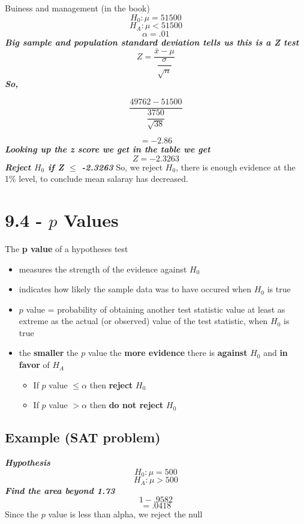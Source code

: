 \documentclass{report}
\begin{document}
\pagebreak
\noindent 
\q
Buiness and management (in the book)
\bigbreak \noindent 
$$ H_0 : \mu = 51500$$
$$ H_A : \mu < 51500$$
$$ \alpha = .01$$
\textit{\textbf{Big sample and population standard deviation tells us this is a Z test}}
$$ Z = \dfrac{\bar{x} - \mu}{\dfrac{\sigma}{\sqrt{n}}}$$
\textit{\textbf{So,}}

$$ \dfrac{49762 - 51500}{\dfrac{3750}{\sqrt{38}}}$$

$$ = -2.86$$
\textit{\textbf{Looking up the z score we get in the table we get}}
$$ Z = -2.3263$$
\textit{\textbf{Reject $H_0$ if Z $\le$ -2.3263}}
So, we reject $H_0$, there is enough evidence at the 1\% level, to conclude mean salaray has decreased.
\section*{9.4 - $p$ Values}
The \textbf{p value} of a hypotheses test
\begin{itemize}[label=$\circ$]
  \item measures the strength of the evidence against $ H_0$
  \item indicates how likely the sample data was to have occured when $H_0$ is true
  \item $p$ value = probability of obtaining another test statistic value at least as extreme as the actual (or observed) value of the test statistic, when $H_0$ is true
  \item the \textbf{smaller} the $p$ value the \textbf{more evidence} there is \textbf{against} $H_0$ and \textbf{in favor} of $H_A$
    \begin{itemize}[label=$\bullet$]
      \item If $p$ value $\leq \alpha$ then \textbf{reject} $H_0$
      \item If $p$ value $> \alpha$ then \textbf{do not reject} $H_0$
    \end{itemize}
\end{itemize}
\subsection*{Example (SAT problem)}
\textit{\textbf{Hypothesis}}
$$ H_0 : \mu = 500$$
$$ H_A : \mu >500$$
\textit{\textbf{Find the area beyond 1.73}}
$$ 1 - .9582$$
$$ = .0418$$
Since the $p$ value is less than alpha, we reject the null

\pagebreak
\end{document}
